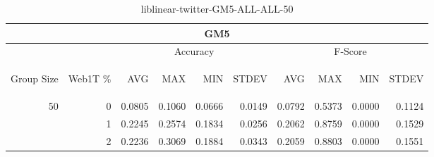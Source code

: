 \begin{center}
\begin{table}[htbp]
\begin{tabular}{ | r | r | r | r | r | r | r | r | r | r |}
\hline
\multicolumn{10}{|c|}{GM5}\\
\hline
 & & \multicolumn{4}{|c|}{Accuracy} & \multicolumn{4}{|c|}{F-Score}\\ \cline{3-10}
\begin{sideways}Group Size\end{sideways} & \begin{sideways}Web1T \%\end{sideways} & \begin{sideways}AVG\end{sideways} & \begin{sideways}MAX\end{sideways} & \begin{sideways}MIN\end{sideways} & \begin{sideways}STDEV\end{sideways} & \begin{sideways}AVG\end{sideways} & \begin{sideways}MAX\end{sideways} & \begin{sideways}MIN\end{sideways} & \begin{sideways}STDEV\end{sideways}\\
\hline
\multirow{3}{*}{50}
 & 0 & 0.0805 & 0.1060 & 0.0666 & 0.0149 & 0.0792 & 0.5373 & 0.0000 & 0.1124\\ \cline{2-10}
 & 1 & 0.2245 & 0.2574 & 0.1834 & 0.0256 & 0.2062 & 0.8759 & 0.0000 & 0.1529\\ \cline{2-10}
 & 2 & 0.2236 & 0.3069 & 0.1884 & 0.0343 & 0.2059 & 0.8803 & 0.0000 & 0.1551\\ \cline{2-10}
\hline
\end{tabular}
\caption{liblinear-twitter-GM5-ALL-ALL-50}
\end{table}
\end{center}


